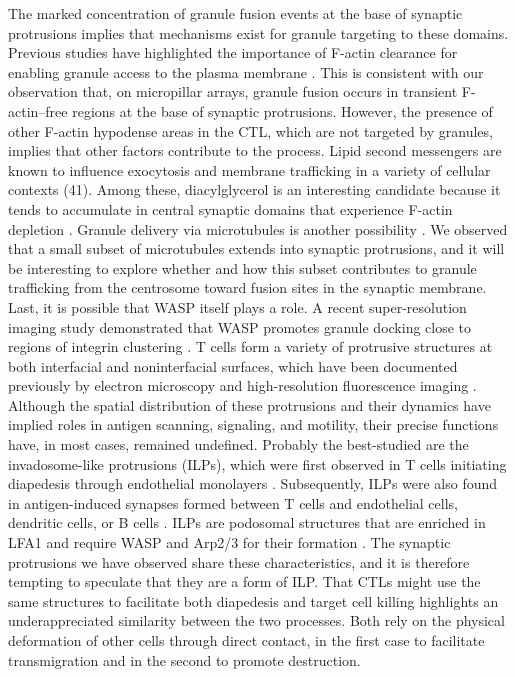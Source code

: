 The marked concentration of granule fusion events at the base of synaptic protrusions implies that mechanisms exist for granule targeting to these domains. Previous studies have highlighted the importance of F-actin clearance for enabling granule access to the plasma membrane \cite{Stinchcombe2006, Ritter2015, Rak2011, Brown2011}. This is consistent with our observation that, on micropillar arrays, granule fusion occurs in transient F-actin–free regions at the base of synaptic protrusions. However, the presence of other F-actin hypodense areas in the CTL, which are not targeted by granules, implies that other factors contribute to the process. Lipid second messengers are known to influence exocytosis and membrane trafficking in a variety of cellular contexts (41). Among these, diacylglycerol is an interesting candidate because it tends to accumulate in central synaptic domains that experience F-actin depletion \cite{Chauveau2014, Liu2013, Basu2014}. Granule delivery via microtubules is another possibility \cite{Wiedemann2006, Butler2009}. We observed that a small subset of microtubules extends into synaptic protrusions, and it will be interesting to explore whether and how this subset contributes to granule trafficking from the centrosome toward fusion sites in the synaptic membrane. Last, it is possible that WASP itself plays a role. A recent super-resolution imaging study demonstrated that WASP promotes granule docking close to regions of integrin clustering \cite{Houmadi2018}. T cells form a variety of protrusive structures at both interfacial and noninterfacial surfaces, which have been documented previously by electron microscopy and high-resolution fluorescence imaging \cite{Sage2012, Cai2017, Carman2007, Ueda2011, Jung2016}. Although the spatial distribution of these protrusions and their dynamics have implied roles in antigen scanning, signaling, and motility, their precise functions have, in most cases, remained undefined. Probably the best-studied are the invadosome-like protrusions (ILPs), which were first observed in T cells initiating diapedesis through endothelial monolayers \cite{Carman2007}. Subsequently, ILPs were also found in antigen-induced synapses formed between T cells and endothelial cells, dendritic cells, or B cells \cite{Sage2012}. ILPs are podosomal structures that are enriched in LFA1 and require WASP and Arp2/3 for their formation \cite{Kumari2015, Carman2007}. The synaptic protrusions we have observed share these characteristics, and it is therefore tempting to speculate that they are a form of ILP. That CTLs might use the same structures to facilitate both diapedesis and target cell killing highlights an underappreciated similarity between the two processes. Both rely on the physical deformation of other cells through direct contact, in the first case to facilitate transmigration and in the second to promote destruction.

